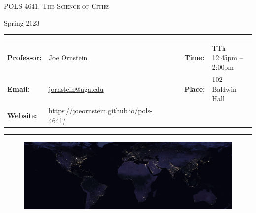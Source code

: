 \documentclass[11pt, letterpaper]{article}
\begin{document}
\begin{center}
{\Large \textsc{POLS 4641: The Science of Cities}}
\end{center}
\begin{center}
{\large Spring 2023}
\end{center}

\begin{center}
\rule{6.5in}{0.4pt}
\begin{minipage}[t]{.96\textwidth}
\begin{tabular}{llcccll}
\textbf{Professor:} & Joe Ornstein & & &  & \textbf{Time:} & TTh 12:45pm -- 2:00pm \\
\textbf{Email:} &  \href{mailto:jornstein@uga.edu}{jornstein@uga.edu} & & & & \textbf{Place:} & 102 Baldwin Hall\\
\textbf{Website:} & \href{https://joeornstein.github.io/pols-4641/}{https://joeornstein.github.io/pols-4641/} & & & & &
\end{tabular}
\end{minipage}
\rule{6.5in}{0.4pt}
\end{center}
\vspace{.15cm}
\setlength{\unitlength}{1in}
\renewcommand{\arraystretch}{2}

\begin{figure}[h]
	\centering
	\includegraphics[width = 1.03\textwidth]{img/night-lights-cropped.jpg}
\end{figure}


\onehalfspacing

\end{document}
